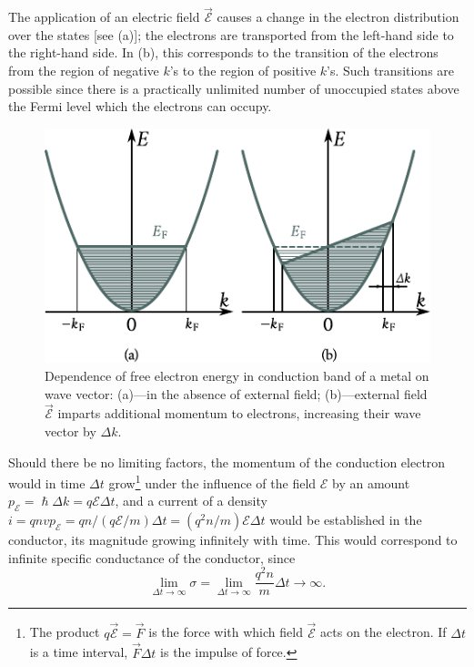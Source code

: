 The application of an electric field $\vec{\mathcal{E}}$ causes a change in the electron
distribution over the states [see (a)]; the electrons are transported from the left-hand side to the right-hand side. In (b), this corresponds to the transition of the electrons from the region of negative $k$'s to the region of positive $k$'s. Such transitions are possible since there is a practically unlimited number of unoccupied states above the Fermi level which the electrons can occupy.

\begin{figure}[t]
	\begin{center}
		\includegraphics[scale=1]{figures/ch_06/fig_6_28.pdf}
		\caption[]{Dependence of free electron energy in conduction band of a metal on wave vector: (a)---in the absence of external field; (b)---external field $\vec{\mathcal{E}}$ imparts additional momentum to electrons, increasing their wave vector by $\Delta{k}$.}
		\label{fig:6_28}
	\end{center}
	\vspace{-0.7cm}
\end{figure}

Should there be no limiting factors, the momentum of the conduction electron would in time $\Delta{t}$ grow\footnote{The product $q\vec{\mathcal{E}}=\vec{F}$ is the force with which field $\vec{\mathcal{E}}$ acts on the electron. If $\Delta{t}$ is a time interval, $\vec{F}\Delta{t}$ is the impulse of force.} under the influence of the field $\mathcal{E}$ by an amount $p_{\mathcal{E}}=\hslash\Delta{k}=q\mathcal{E}\Delta{t}$, and a current of a density $i=qnvp_{\mathcal{E}}=qn/(q\mathcal{E}/m)\Delta{t}=(q^2n/m)\mathcal{E}\Delta{t}$ would be established in the conductor, its magnitude growing infinitely with time.
This would correspond to infinite specific conductance of the conductor, since
\begin{equation}\label{eq:6_52}
	\lim_{\Delta{t}\to\infty} \sigma = \lim_{\Delta{t}\to\infty} \frac{q^2 n}{m} \Delta{t} \to \infty.
\end{equation}

